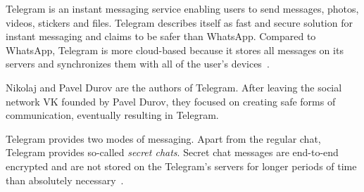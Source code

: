 \documentclass[thesis=M,english]{FITthesis}[2012/10/20]
\begin{document}
Telegram is an instant messaging service enabling users to send messages, photos, videos, stickers and files. Telegram describes itself as fast and secure solution for instant messaging and claims to be safer than WhatsApp. Compared to WhatsApp, Telegram is more cloud-based because it stores all messages on its servers and synchronizes them with all of the user's devices~\cite{telegramfaq}.

Nikolaj and Pavel Durov are the authors of Telegram. After leaving the social network VK founded by Pavel Durov, they focused on creating safe forms of communication, eventually resulting in Telegram.

Telegram provides two modes of messaging. Apart from the regular chat, Telegram provides so-called \emph{secret chats}. Secret chat messages are end-to-end encrypted and are not stored on the Telegram's servers for longer periods of time than absolutely necessary~\cite{telegramfaq}.
\end{document}
